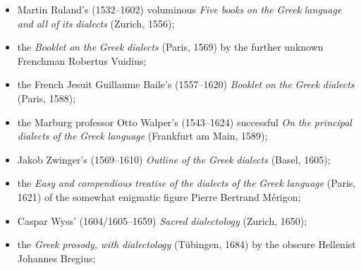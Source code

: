 \documentclass[output=paper]{langsci/langscibook}
\begin{document}
\begin{itemize}
\item \begin{styleListParagraph}
Martin Ruland’s (1532–1602) voluminous \textit{Five} \textit{books} \textit{on} \textit{the} \textit{Greek} \textit{language} \textit{and} \textit{all} \textit{of} \textit{its} \textit{dialects} (Zurich, 1556);
\end{styleListParagraph}
\item \begin{styleListParagraph}
the \textit{Booklet} \textit{on} \textit{the} \textit{Greek} \textit{dialects} (Paris, 1569) by the further unknown Frenchman Robertus Vuidius;
\end{styleListParagraph}
\item \begin{styleListParagraph}
the French Jesuit Guillaume Baile’s (1557–1620) \textit{Booklet} \textit{on} \textit{the} \textit{Greek} \textit{dialects} (Paris, 1588);
\end{styleListParagraph}
\item \begin{styleListParagraph}
the Marburg professor Otto Walper’s (1543–1624) successful \textit{On} \textit{the} \textit{principal} \textit{dialects} \textit{of} \textit{the} \textit{Greek} \textit{language} (Frankfurt am Main, 1589);
\end{styleListParagraph}
\item \begin{styleListParagraph}
Jakob Zwinger’s (1569–1610) \textit{Outline} \textit{of} \textit{the} \textit{Greek} \textit{dialects} (Basel, 1605);
\end{styleListParagraph}
\item \begin{styleListParagraph}
the \textit{Easy} \textit{and} \textit{compendious} \textit{treatise} \textit{of} \textit{the} \textit{dialects} \textit{of} \textit{the} \textit{Greek} \textit{language} (Paris, 1621) of the somewhat enigmatic figure Pierre Bertrand Mérigon;
\end{styleListParagraph}
\item \begin{styleListParagraph}
Caspar Wyss’ (1604/1605–1659) \textit{Sacred} \textit{dialectology} (Zurich, 1650);
\end{styleListParagraph}
\item \begin{styleListParagraph}
the \textit{Greek} \textit{prosody,} \textit{with} \textit{dialectology} (Tübingen, 1684) by the obscure Hellenist Johannes Bregius;

\end{styleListParagraph}
\end{itemize}
\end{document}
